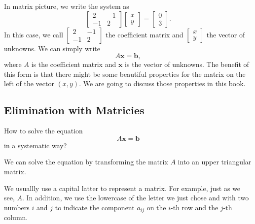 \documentclass[11pt]{article}
\theoremstyle{break}
\theoremstyle{no_label}
\newcommand{\bfb}{\textbf{b}}
\newcommand{\bfx}{\textbf{x}}
\numberwithin{equation}{theorem}
\begin{document}
In matrix picture, we write the system as
\begin{equation}\label{example equation in form of matrix}
    \begin{bmatrix}
        2 & -1 \\ -1 & 2
    \end{bmatrix}\begin{bmatrix}
        x \\ y
    \end{bmatrix}=\begin{bmatrix}
        0 \\ 3
    \end{bmatrix}.
\end{equation}
In this case, we call $\begin{bmatrix}
    2 & -1 \\ -1 & 2
\end{bmatrix}$ the coefficient matrix and $\begin{bmatrix}
    x \\ y
\end{bmatrix}$ the vector of unknowns. We can simply write \begin{equation*}
    A\bfx=\bfb,
\end{equation*}
where $A$ is the coefficient matrix and $\bfx$ is the vector of unknowns. The benefit of this form is that there might be some beautiful properties for the matrix on the left of the vector $(x, y)$. We are going to discuss those properties in this book.

\subsection{Elimination with Matricies}

\begin{question}
    How to solve the equation \begin{equation*}
        A\bfx=\bfb
    \end{equation*}
    in a systematic way?
\end{question}

We can solve the equation by transforming the matrix $A$ into an upper triangular matrix.

\begin{notation}[Matrix]
    We usuallly use a capital latter to represent a matrix. For example, just as we see, $A$. In addition, we use the lowercase of the letter we just chose and with two numbers $i$ and $j$ to indicate the component $a_{ij}$ on the $i$-th row and the $j$-th column.
\end{notation}
\end{document}
